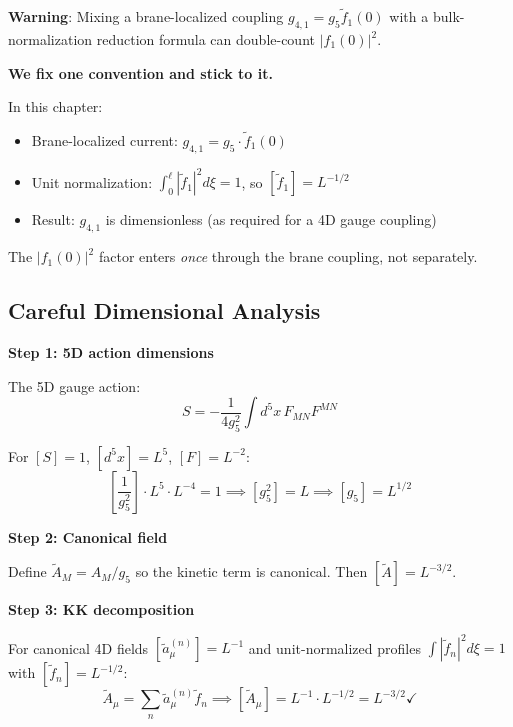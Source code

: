 \begin{tcolorbox}[colback=red!5!white, colframe=red!50!black,
    title=\textbf{Common Pitfall: Double Counting $|f_1(0)|^2$}]

\textbf{Warning}: Mixing a brane-localized coupling $g_{4,1} = g_5 \tilde{f}_1(0)$ with
a bulk-normalization reduction formula can double-count $|f_1(0)|^2$.

\textbf{We fix one convention and stick to it.}

In this chapter:
\begin{itemize}
    \item Brane-localized current: $g_{4,1} = g_5 \cdot \tilde{f}_1(0)$
    \item Unit normalization: $\int_0^\ell |\tilde{f}_1|^2 d\xi = 1$, so $[\tilde{f}_1] = L^{-1/2}$
    \item Result: $g_{4,1}$ is dimensionless (as required for a 4D gauge coupling)
\end{itemize}

The $|f_1(0)|^2$ factor enters \emph{once} through the brane coupling, not separately.

\end{tcolorbox}

\subsection{Careful Dimensional Analysis}
\label{sec:ch19_dimensions}

\textbf{Step 1: 5D action dimensions}

The 5D gauge action:
\begin{equation}
    S = -\frac{1}{4g_5^2} \int d^5x \, F_{MN} F^{MN}
\end{equation}

For $[S] = 1$, $[d^5x] = L^5$, $[F] = L^{-2}$:
\begin{equation}
    \left[\frac{1}{g_5^2}\right] \cdot L^5 \cdot L^{-4} = 1
    \implies [g_5^2] = L \implies [g_5] = L^{1/2}
\end{equation}

\textbf{Step 2: Canonical field}

Define $\tilde{A}_M = A_M / g_5$ so the kinetic term is canonical. Then $[\tilde{A}] = L^{-3/2}$.

\textbf{Step 3: KK decomposition}

For canonical 4D fields $[\tilde{a}_\mu^{(n)}] = L^{-1}$ and unit-normalized profiles
$\int |\tilde{f}_n|^2 d\xi = 1$ with $[\tilde{f}_n] = L^{-1/2}$:
\begin{equation}
    \tilde{A}_\mu = \sum_n \tilde{a}_\mu^{(n)} \tilde{f}_n \implies
    [\tilde{A}_\mu] = L^{-1} \cdot L^{-1/2} = L^{-3/2} \checkmark
\end{equation}

